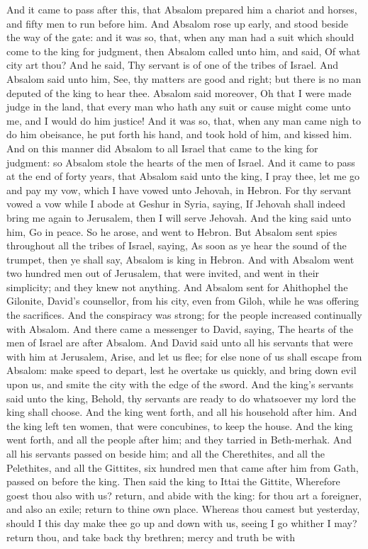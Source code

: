 And it came to pass after this, that Absalom prepared him a chariot and horses, and fifty men to run before him. And Absalom rose up early, and stood beside the way of the gate: and it was so, that, when any man had a suit which should come to the king for judgment, then Absalom called unto him, and said, Of what city art thou? And he said, Thy servant is of one of the tribes of Israel. And Absalom said unto him, See, thy matters are good and right; but there is no man deputed of the king to hear thee. Absalom said moreover, Oh that I were made judge in the land, that every man who hath any suit or cause might come unto me, and I would do him justice! And it was so, that, when any man came nigh to do him obeisance, he put forth his hand, and took hold of him, and kissed him. And on this manner did Absalom to all Israel that came to the king for judgment: so Absalom stole the hearts of the men of Israel.  And it came to pass at the end of forty years, that Absalom said unto the king, I pray thee, let me go and pay my vow, which I have vowed unto Jehovah, in Hebron. For thy servant vowed a vow while I abode at Geshur in Syria, saying, If Jehovah shall indeed bring me again to Jerusalem, then I will serve Jehovah. And the king said unto him, Go in peace. So he arose, and went to Hebron. But Absalom sent spies throughout all the tribes of Israel, saying, As soon as ye hear the sound of the trumpet, then ye shall say, Absalom is king in Hebron. And with Absalom went two hundred men out of Jerusalem, that were invited, and went in their simplicity; and they knew not anything. And Absalom sent for Ahithophel the Gilonite, David’s counsellor, from his city, even from Giloh, while he was offering the sacrifices. And the conspiracy was strong; for the people increased continually with Absalom.  And there came a messenger to David, saying, The hearts of the men of Israel are after Absalom. And David said unto all his servants that were with him at Jerusalem, Arise, and let us flee; for else none of us shall escape from Absalom: make speed to depart, lest he overtake us quickly, and bring down evil upon us, and smite the city with the edge of the sword. And the king’s servants said unto the king, Behold, thy servants are ready to do whatsoever my lord the king shall choose. And the king went forth, and all his household after him. And the king left ten women, that were concubines, to keep the house. And the king went forth, and all the people after him; and they tarried in Beth-merhak. And all his servants passed on beside him; and all the Cherethites, and all the Pelethites, and all the Gittites, six hundred men that came after him from Gath, passed on before the king.  Then said the king to Ittai the Gittite, Wherefore goest thou also with us? return, and abide with the king: for thou art a foreigner, and also an exile; return to thine own place. Whereas thou camest but yesterday, should I this day make thee go up and down with us, seeing I go whither I may? return thou, and take back thy brethren; mercy and truth be with 